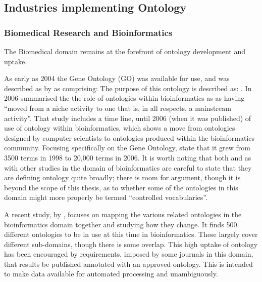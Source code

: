 \subsection{Industries implementing Ontology}
\subsubsection{Biomedical Research and Bioinformatics}
\label{sec:biomedical}
The Biomedical domain remains at the forefront of ontology development and uptake.

As early as 2004 the Gene Ontology (GO) was available for use, and was described as by \citet{Smith2004} as comprising:  The purpose of this ontology is described as: .  In 2006 \citet{Bodenreider2006} summarised the the role of ontologies within bioinformatics as as having ``moved from a niche activity to one that is, in all respects, a mainstream activity''. That study includes a time line, until 2006 (when it was published) of use of ontology within bioinformatics, which shows a move from ontologies designed by computer scientists to ontologies produced within the bioinformatics community. Focusing specifically on the Gene Ontology, \citet{Bodenreider2006} state that it grew from 3500 terms in 1998 to 20,000 terms in 2006. It is worth noting that both \citet{Bodenreider2006} and \citet{Gro2016} as with other studies in the domain of bioinformatics are careful to state that they are defining ontology quite broadly; there is room for argument, though it is beyond the scope of this thesis, as to whether some of the ontologies in this domain might more properly be termed ``controlled vocabularies''.

A recent study, by \citet{Gro2016}, focuses on mapping the various related ontologies in the bioinformatics domain together and studying how they change. It finds 500 different ontologies to be in use at this time in bioinformatics. These largely cover different sub-domains, though there is some overlap. This high uptake of ontology has been encouraged by requirements, imposed by some journals in this domain, that results be published annotated with an approved ontology. This is intended to make data available for automated processing and unambiguously.

